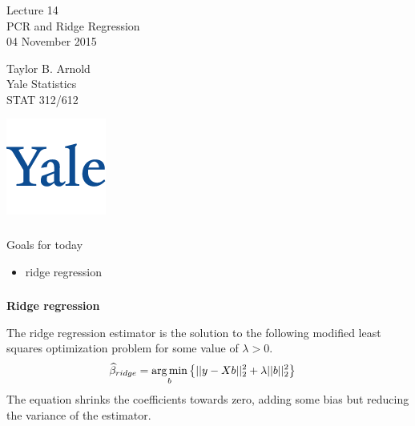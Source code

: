 



\begin{frame}[fragile] \frametitle{}

\vfill

{\fontsize{0.7cm}{0cm}\selectfont Lecture 14 \\\vspace{0.2cm}
PCR and Ridge Regression}\\\vspace{0.5cm}
04 November 2015

\vspace{2cm}

\begin{minipage}{0.6\textwidth}
Taylor B. Arnold \\
Yale Statistics \\
STAT 312/612
\end{minipage}
\hfill
\begin{minipage}{0.3\textwidth}\raggedleft
\includegraphics[scale=0.3]{../yale-logo.png}
\end{minipage}%

\end{frame}

\begin{frame}[fragile] \frametitle{}

{\color{yaleblue}\fontsize{16pt}{20pt}\selectfont Goals for today}

\begin{itemize}
\item ridge regression
\end{itemize}

\end{frame}

\begin{frame}[fragile] \frametitle{}

\textbf{Ridge regression}

The ridge regression estimator is the solution to the following
modified least squares optimization problem for some value of $\lambda > 0$.
\begin{align*}
\widehat{\beta}_{ridge} &= \mathop{\mathrm{arg\,min}}_b \left\{ || y - Xb ||_2^2 + \lambda || b ||_2^2 \right\}
\end{align*}
\pause The equation shrinks the coefficients towards zero, adding some bias but
reducing the variance of the estimator.

\end{frame}

